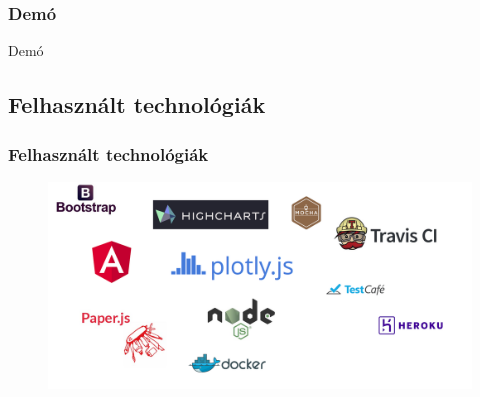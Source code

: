 \begin{frame}
	\frametitle{Demó}
	\Huge{\centerline{Demó}}
\end{frame}

\subsection{Felhasznált technológiák}
\begin{frame}
\frametitle{Felhasznált technológiák}
\begin{figure}[ht!]
	\centering
	\includegraphics[width=\linewidth]{images/technologies}
\end{figure}
\end{frame}
